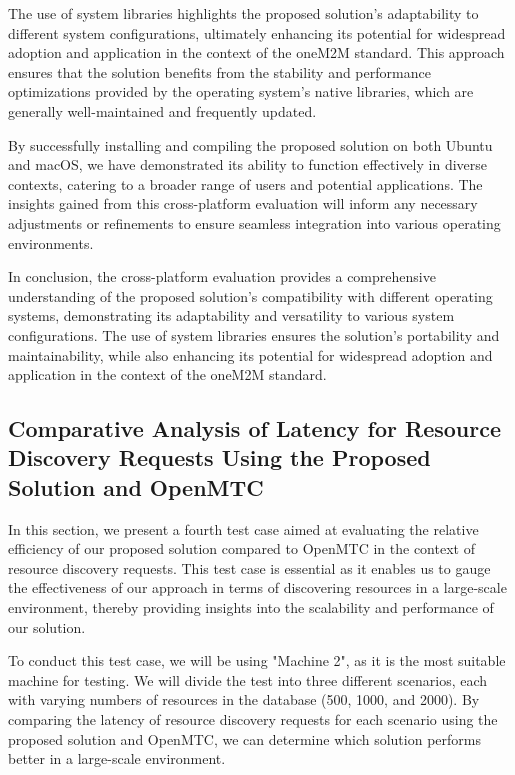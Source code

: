 \documentclass[a4paper,fleqn]{cas-dc}
\begin{document}
The use of system libraries highlights the proposed solution's adaptability to different system configurations, ultimately enhancing its potential for widespread adoption and application in the context of the oneM2M standard. This approach ensures that the solution benefits from the stability and performance optimizations provided by the operating system's native libraries, which are generally well-maintained and frequently updated.

By successfully installing and compiling the proposed solution on both Ubuntu and macOS, we have demonstrated its ability to function effectively in diverse contexts, catering to a broader range of users and potential applications. The insights gained from this cross-platform evaluation will inform any necessary adjustments or refinements to ensure seamless integration into various operating environments.

In conclusion, the cross-platform evaluation provides a comprehensive understanding of the proposed solution's compatibility with different operating systems, demonstrating its adaptability and versatility to various system configurations. The use of system libraries ensures the solution's portability and maintainability, while also enhancing its potential for widespread adoption and application in the context of the oneM2M standard.

\subsection{Comparative Analysis of Latency for Resource Discovery Requests Using the Proposed Solution and OpenMTC}

In this section, we present a fourth test case aimed at evaluating the relative efficiency of our proposed solution compared to OpenMTC in the context of resource discovery requests. This test case is essential as it enables us to gauge the effectiveness of our approach in terms of discovering resources in a large-scale environment, thereby providing insights into the scalability and performance of our solution.

To conduct this test case, we will be using "Machine 2", as it is the most suitable machine for testing. We will divide the test into three different scenarios, each with varying numbers of resources in the database (500, 1000, and 2000). By comparing the latency of resource discovery requests for each scenario using the proposed solution and OpenMTC, we can determine which solution performs better in a large-scale environment.
\end{document}
